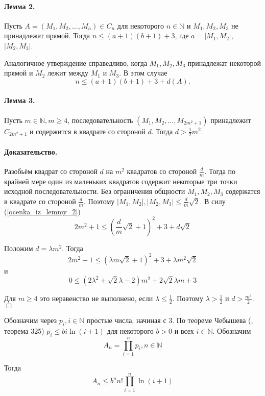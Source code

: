 \documentclass[a4paper,14pt]{article} %
\begin{document}
\paragraph{Лемма 2.}

Пусть $A=(M_1, M_2, ..., M_n) \in C_n$ для некоторого $n\in \mathbb{N}$ и $M_1, M_2, M_3$ не принадлежат прямой.
Тогда $n\leq (a+1)(b+1)+3$, где $a=|M_1,M_2|$, $|M_2,M_3|$.

Аналогичное утверждение справедливо, когда $M_1,M_2,M_3$ принадлежат некоторой прямой и $M_2$ лежит между $M_1$ и $M_3$.
В этом случае
\begin{equation}\label{ocenka_iz_lemmy_2}
	n\leq (a+1)(b+1)+3+d(A).
\end{equation}



\paragraph{Лемма 3.}
Пусть $m\in\mathbb{N}, m\geq 4$, последовательность $(M_1,M_2,...,M_{2m^2+1})$ принадлежит $C_{2m^2+1}$ и содержится в квадрате со стороной $d$.
Тогда $d>\frac{1}{2}m^2$.

\paragraph{Доказательство.} Разобьём квадрат со стороной $d$ на $m^2$ квадратов со стороной $\frac{d}{m}$.
Тогда по крайней мере один из маленьких квадратов содержит некоторые три точки исходной последовательности.
Без ограничения общности $M_1,M_2,M_3$ содержатся в квадрате со стороной $\frac{d}{m}$.
Поэтому $|M_1,M_2|,|M_2,M_3| \leq \frac{d}{m}\sqrt{2}$.
В силу (\ref{ocenka_iz_lemmy_2})
$$
2m^2+1 \leq\left(\frac{d}{m}\sqrt{2}+1\right)^2+3+d\sqrt{2}
$$

Положим $d=\lambda m^2$.
Тогда
$$
2m^2+1 \leq \left(\lambda m \sqrt2 + 1 \right)^2 + 3 + \lambda m^2 \sqrt2
$$
и
$$
0\leq \left( 2\lambda^2 + \sqrt2 \lambda - 2 \right)m^2 + 2\sqrt2 \lambda m + 3
$$

Для $m\geq 4$ это неравенство не выполнено, если $\lambda \leq \frac{1}{2}$.
Поэтому $\lambda > \frac{1}{2}$ и $d>\frac{m^2}{2}$.
$\Box$


Обозначим через $p_i, i\in\mathbb{N}$ простые числа, начиная с 3.
По теореме Чебышева (\cite{Buhshtab}, теорема 325) $p_i \leq bi\ln(i+1)$ для некоторого $b>0$ и всех $i\in\mathbb{N}$.
Обозначим
$$
A_n=\prod_{i=1}^{n} p_i, n\in\mathbb{N}
$$

Тогда
$$
A_n\leq b^n n! \prod_{i=1}^{n} \ln(i+1)
$$
\end{document}
